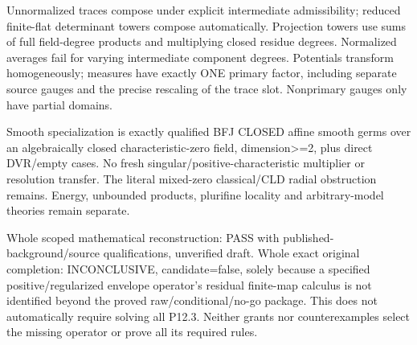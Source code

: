 \documentclass[11pt]{article}
\begin{document}
\begin{GrantData}
Unnormalized traces compose under explicit intermediate admissibility; reduced finite-flat determinant towers compose automatically. Projection towers use sums of full field-degree products and multiplying closed residue degrees. Normalized averages fail for varying intermediate component degrees. Potentials transform homogeneously; measures have exactly ONE primary factor, including separate source gauges and the precise rescaling of the trace slot. Nonprimary gauges only have partial domains.

Smooth specialization is exactly qualified BFJ CLOSED affine smooth germs over an algebraically closed characteristic-zero field, dimension>=2, plus direct DVR/empty cases. No fresh singular/positive-characteristic multiplier or resolution transfer. The literal mixed-zero classical/CLD radial obstruction remains. Energy, unbounded products, plurifine locality and arbitrary-model theories remain separate.

Whole scoped mathematical reconstruction: PASS with published-background/source qualifications, unverified draft. Whole exact original completion: INCONCLUSIVE, candidate=false, solely because a specified positive/regularized envelope operator's residual finite-map calculus is not identified beyond the proved raw/conditional/no-go package. This does not automatically require solving all P12.3. Neither grants nor counterexamples select the missing operator or prove all its required rules.

\end{GrantData}
\end{document}
